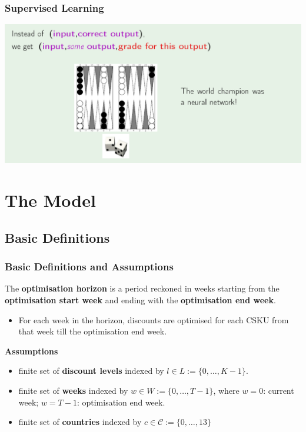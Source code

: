 \documentclass[xcolor=table]{beamer}
\begin{document}
\begin{frame}[t]
\frametitle{Supervised Learning}
\begin{center}
\includegraphics[scale=0.22]{reinforced_learning.png}
\end{center}
\end{frame}




\section{The Model}

\subsection{Basic Definitions}

\begin{frame}[t]
  \frametitle{Basic Definitions and Assumptions}
  \begin{definition}
  The \textcolor{orange2}{\textbf{optimisation horizon}} is a period reckoned in
  weeks starting from the \textcolor{orange2}{\textbf{optimisation start week}}
  and ending with the \textcolor{orange2}{\textbf{optimisation end week}}.
  \end{definition}
    \begin{itemize}
    \item For each week in the horizon, discounts are optimised for each CSKU from that
      week till the optimisation end week.
    \end{itemize}

\textbf{Assumptions}
    \begin{itemize}
      \item finite set of \textcolor{orange2}{\textbf{discount levels}} indexed
        by $l \in L := \{0, \ldots, K - 1\}$.
    \item finite set of \textcolor{orange2}{\textbf{weeks}} indexed by $w \in W
      := \{0 , \ldots, T - 1\}$,
      where $w = 0$: current week; $w = T - 1$: optimisation end week.
    \item finite set of \textcolor{orange2}{\textbf{countries}} indexed by $c
      \in \mathcal{C} := \{0, \ldots, 13\}$
  \end{itemize}
\end{frame}
\end{document}
